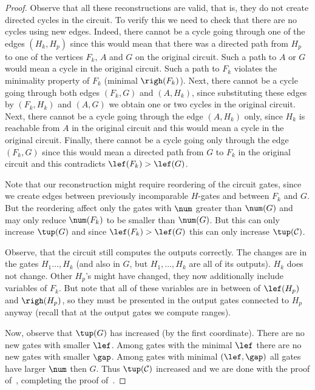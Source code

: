 \documentclass{toc}
\begin{document}
\begin{proof}[Proof]
    Observe that all these reconstructions are valid, that is, they do not create directed cycles in the circuit. To verify this we need to check that there are no cycles using new edges. Indeed, there cannot be a cycle going through one of the edges $(H_k,H_p)$ since this would mean that there was a directed path from $H_p$ to one of the vertices $F_k$, $A$ and $G$ on the original circuit. Such a path to $A$ or $G$ would mean a cycle in the original circuit. Such a path to $F_k$ violates the minimality property of $F_k$ (minimal $\righ(F_k)$). Next, there cannot be a cycle going through both edges $(F_k,G)$ and $(A,H_k)$, since substituting these edges by $(F_k,H_k)$ and $(A,G)$ we obtain one or two cycles in the original circuit. Next, there cannot be a cycle going through the edge $(A,H_k)$ only, since $H_k$ is reachable from $A$ in the original circuit and this would mean a cycle in the original circuit. Finally, there cannot be a cycle going only through the edge $(F_k,G)$ since this would mean a directed path from $G$ to $F_k$ in the original circuit and this contradicts $\lef(F_k)>\lef(G)$.

    Note that our reconstruction might require reordering of the circuit gates, since we create edges between previously incomparable $H$-gates and between $F_k$ and $G$. But the reordering affect only the gates with $\num$ greater than $\num(G)$ and may only reduce $\num(F_k)$ to be smaller than $\num(G)$. But this can only increase $\tup(G)$ and since $\lef(F_k)>\lef(G)$ this can only increase $\tup({\cal C})$.

    Observe, that the circuit still computes the outputs correctly. The changes are in the gates $H_1\ldots, H_k$ (and also in $G$, but $H_1,\ldots, H_k$ are all of its outputs). $H_k$ does not change. Other $H_p$'s might have changed, they now additionally include variables of $F_k$. But note that all of these variables are in between of $\lef(H_p)$ and $\righ(H_p)$, so they must be presented in the output gates connected to $H_p$ anyway (recall that at the output gates we compute ranges).

    Now, observe that $\tup(G)$ has increased (by the first coordinate). There are no new gates with smaller $\lef$. Among gates with the minimal $\lef$ there are no new gates with smaller $\gap$. Among gates with minimal $(\lef,\gap)$ all gates have larger $\num$ then $G$. Thus $\tup({\cal C})$ increased
    and we are done  %
%
	with the proof of~,
	completing the proof of~.
\end{proof}
\end{document}
